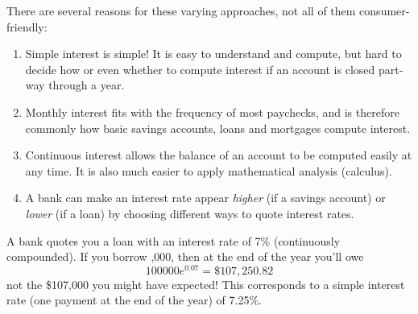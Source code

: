 There are several reasons for these varying approaches, not all of them consumer-friendly:
\begin{enumerate}
  \item Simple interest is simple! It is easy to understand and compute, but hard to decide how or even whether to compute interest if an account is closed part-way through a year.
  \item Monthly interest fits with the frequency of most paychecks, and is therefore commonly how basic savings accounts, loans and mortgages compute interest.
  \item Continuous interest allows the balance of an account to be computed easily at any time. It is also much easier to apply mathematical analysis (calculus).
  \item A bank can make an interest rate appear \emph{higher} (if a savings account) or \emph{lower} (if a loan) by choosing different ways to quote interest rates.
\end{enumerate}


\begin{example}{}{}
	A bank quotes you a loan with an interest rate of 7\% (continuously compounded). If you borrow ,000, then at the end of the year you'll owe
		\[
			100000e^{0.07} =\$107,\!250.82
		\]
		not the \$107,000 you might have expected! This corresponds to a simple interest rate (one payment at the end of the year) of 7.25\%.\footnotemark{}
\end{example}




